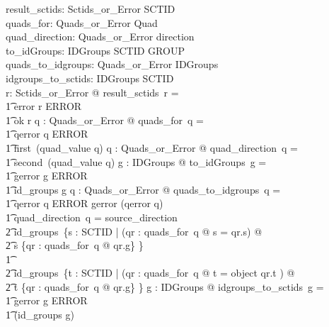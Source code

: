 \documentclass{article}
\begin{document}
\begin{gendef}
   result\_sctids: Sctids\_or\_Error \fun \power SCTID \\
   quads\_for: Quads\_or\_Error \fun \power Quad  \\
   quad\_direction: Quads\_or\_Error \pfun direction \\
   to\_idGroups: IDGroups \fun SCTID \fun \power GROUP \\
   quads\_to\_idgroups: Quads\_or\_Error \fun IDGroups \\
   idgroups\_to\_sctids: IDGroups \fun \power SCTID \\
\where
   \forall r: Sctids\_or\_Error @ result\_sctids~r = \\
\t1 \IF error \inv r \in ERROR \THEN \emptyset \\
\t1 \ELSE ok \inv r
\also
   \forall q : Quads\_or\_Error @ quads\_for~q = \\
\t1 \IF qerror \inv q \in ERROR \THEN \emptyset \\
\t1 \ELSE first~(quad\_value \inv q)
\also
   \forall q : Quads\_or\_Error @ quad\_direction~q = \\
\t1 second~(quad\_value \inv q)
\also
   \forall g : IDGroups @ to\_idGroups~g = \\
\t1 \IF gerror \inv g \in ERROR \THEN \emptyset \\
\t1 \ELSE id\_groups \inv g
\also
   \forall q : Quads\_or\_Error @ quads\_to\_idgroups~q = \\
\t1 \IF qerror  \inv q \in ERROR \THEN gerror (qerror \inv q) \\
\t1 \ELSE \IF quad\_direction~q = source\_direction \\
\t2 \THEN id\_groups~\{s : SCTID | (\exists qr : quads\_for~q @ s = qr.s) @ \\
\t2 s \mapsto \{qr : quads\_for~q @ qr.g\} \} \\
\t1 \ELSE \\
\t2 id\_groups~\{t : SCTID | (\exists qr : quads\_for~q @ t = object \inv qr.t ) @ \\
\t2 t \mapsto \{qr : quads\_for~q @ qr.g\} \} 
\also
   \forall g : IDGroups @ idgroups\_to\_sctids~g = \\
\t1 \IF gerror \inv g \in ERROR \THEN \emptyset \\
\t1 \ELSE \dom (id\_groups \inv g)
\end{gendef}
\end{document}
